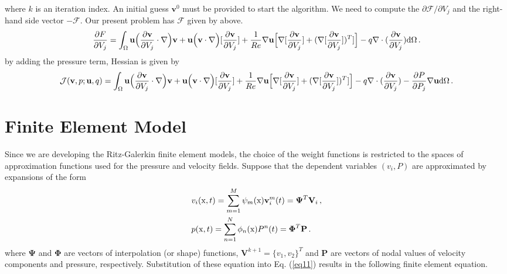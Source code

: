 \documentclass[]{article}
\begin{document}
where $k$ is an iteration index. An initial guess $\mathbf{v}^0$ must be provided to start the algorithm. We need to compute the $\partial \mathcal{F}/\partial V_j$ and the right-hand side vector $-\mathcal{F}$. Our present problem has $\mathcal{F}$ given by above.
\begin{equation}\label{eq11}
	\begin{aligned}
		{\partial F\over\partial V_j} = \int_\Omega \mathbf{u} \Big(\frac{\partial \mathbf{v}}{\partial V_j}\cdot\nabla\Big) \mathbf{v}  + \mathbf{u}\Big(\mathbf{v} \cdot \nabla\Big) [\frac{\partial \mathbf{v}}{\partial V_j}] + \frac{1}{Re} \nabla \mathbf{u} \Big[\nabla[\frac{\partial \mathbf{v}}{\partial V_j}] + (\nabla[\frac{\partial \mathbf{v}}{\partial V_j}])^T]\Big] - q \nabla \cdot (\frac{\partial \mathbf{v}}{\partial V_j}) \mathrm{d}\Omega\thinspace .
	\end{aligned}
\end{equation}
by adding the pressure term, Hessian is given by
\begin{equation}\label{eq11}
	\begin{aligned}
		\mathcal{J}(\mathbf{v},p;\mathbf{u},q) = \int_\Omega \mathbf{u} \Big(\frac{\partial \mathbf{v}}{\partial V_j}\cdot \nabla\Big) \mathbf{v}  + \mathbf{u}\Big(\mathbf{v} \cdot \nabla\Big) [\frac{\partial \mathbf{v}}{\partial V_j}] + \frac{1}{Re} \nabla \mathbf{u} \Big[\nabla[\frac{\partial \mathbf{v}}{\partial V_j}] + (\nabla[\frac{\partial \mathbf{v}}{\partial V_j}])^T]\Big] - q \nabla \cdot (\frac{\partial \mathbf{v}}{\partial V_j}) - \frac{\partial P}{\partial P_j}\nabla \mathbf{u}\mathrm{d}\Omega\thinspace .
	\end{aligned}
\end{equation}

\section{Finite Element Model} \label{sec: FEM}
Since we are developing the Ritz-Galerkin finite element models, the choice
of the weight functions is restricted to the spaces of approximation functions
used for the pressure and velocity fields. Suppose that the dependent variables
$(v_i, P )$ are approximated by expansions of the form
\begin{equation}\label{eq12}
	\begin{aligned}
		&v_i(\mathrm{x}, t)= \sum_{m=1}^{M} \psi_m(\mathrm{x}) \mathbf{v}_i^m(t) = \boldsymbol{\Psi}^T\mathbf{V}_i \thinspace,\\
		&p(\mathrm{x}, t)= \sum_{n=1}^{N} \phi_n(\mathrm{x}) P^n(t) = \boldsymbol{\Phi}^T\mathbf{P} \thinspace.
	\end{aligned}
\end{equation}
where $\boldsymbol{\Psi}$ and $\boldsymbol{\Phi}$ are vectors of interpolation (or shape) functions, $\mathbf{V}^{k+1} = \{v_1,v_2\}^T$ and
$\mathbf{P}$ are vectors of nodal values of velocity components and pressure, respectively. Substitution of these equation into Eq. (\ref{eq11}) results in the following finite element equation.
\end{document}
